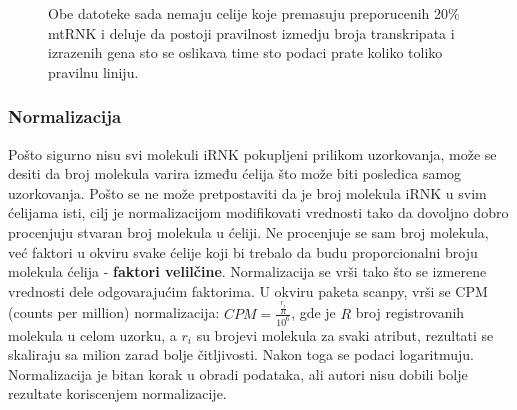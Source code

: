 \documentclass{article}
\begin{document}
\begin{figure}[H]
    \centering
    \caption{ Obe datoteke sada nemaju celije koje premasuju preporucenih 20\% mtRNK i deluje da postoji pravilnost izmedju broja transkripata i izrazenih gena sto se oslikava time sto podaci prate koliko toliko pravilnu liniju. }
    \label{fig:genes_counts_filtered_group_2}
\end{figure}

\subsubsection{Normalizacija}

Pošto sigurno nisu svi molekuli iRNK pokupljeni prilikom uzorkovanja, može se desiti da broj molekula varira između ćelija što može biti posledica samog uzorkovanja. Pošto se ne može pretpostaviti da je broj molekula iRNK u svim ćelijama isti, cilj je normalizacijom modifikovati vrednosti tako da dovoljno dobro procenjuju stvaran broj molekula u ćeliji. Ne procenjuje se sam broj molekula, već faktori u okviru svake ćelije koji bi trebalo da budu proporcionalni broju molekula ćelija - \textbf{faktori velilčine}. Normalizacija se vrši tako što se izmerene vrednosti dele odgovarajućim faktorima. U okviru paketa scanpy, vrši se CPM (counts per million) normalizacija: $CPM = \frac{\frac{r_i}{R}}{10^6}$, gde je $R$ broj registrovanih molekula u celom uzorku, a $r_i$ su brojevi molekula za svaki atribut, rezultati se skaliraju sa milion zarad bolje čitljivosti. Nakon toga se podaci logaritmuju. Normalizacija je bitan korak u obradi podataka\cite{luecken2019current, long2019cluster}, ali autori \cite{PBMC_ANN_classification} nisu dobili bolje rezultate koriscenjem normalizacije.
\end{document}
